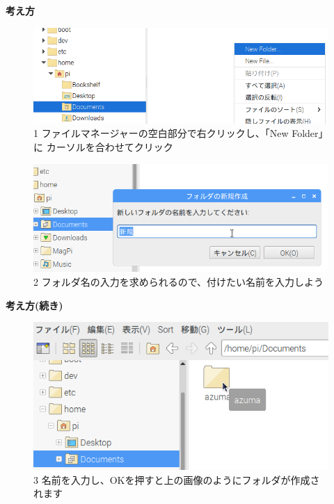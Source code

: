 \documentclass[a4paper,12pt]{jarticle}
\begin{document}
{\bf \large 考え方}
\begin{figure}[ht]
  \centering
  \begin{minipage}{0.9\textwidth}
    \includegraphics[width=\linewidth]{textbook-img034.png}
    \\1
    ファイルマネージャーの空白部分で右クリックし、「New Folder」に
    カーソルを合わせてクリック
     \vspace{60pt}
  \end{minipage}

  \centering
  \begin{minipage}{0.9\textwidth}
    \includegraphics[width=\linewidth]{textbook-img036.png}
    2
    フォルダ名の入力を求められるので、付けたい名前を入力しよう
  \end{minipage}
\end{figure}
\clearpage
{\bf\large 考え方(続き)}
\begin{figure}[hb]
  \centering
  \begin{minipage}{0.9\textwidth}
   \includegraphics[width=\linewidth]{textbook-img038.png}
    3
    名前を入力し、OKを押すと上の画像のようにフォルダが作成されます
  \end{minipage}

\end{figure}
\end{document}
